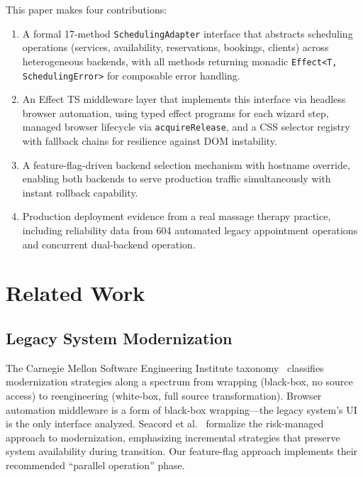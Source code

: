 \documentclass[conference]{IEEEtran}
\begin{document}
This paper makes four contributions:

\begin{enumerate}
\item A formal 17-method \texttt{SchedulingAdapter} interface that abstracts scheduling operations (services, availability, reservations, bookings, clients) across heterogeneous backends, with all methods returning monadic \texttt{Effect<T, SchedulingError>} for composable error handling.

\item An Effect TS middleware layer that implements this interface via headless browser automation, using typed effect programs for each wizard step, managed browser lifecycle via \texttt{acquireRelease}, and a CSS selector registry with fallback chains for resilience against DOM instability.

\item A feature-flag-driven backend selection mechanism with hostname override, enabling both backends to serve production traffic simultaneously with instant rollback capability.

\item Production deployment evidence from a real massage therapy practice, including reliability data from 604 automated legacy appointment operations and concurrent dual-backend operation.
\end{enumerate}

\section{Related Work}

\subsection{Legacy System Modernization}

The Carnegie Mellon Software Engineering Institute taxonomy~\cite{sei-legacy} classifies modernization strategies along a spectrum from wrapping (black-box, no source access) to reengineering (white-box, full source transformation). Browser automation middleware is a form of black-box wrapping---the legacy system's UI is the only interface analyzed. Seacord et al.~\cite{seacord-modernizing} formalize the risk-managed approach to modernization, emphasizing incremental strategies that preserve system availability during transition. Our feature-flag approach implements their recommended ``parallel operation'' phase.
\end{document}
